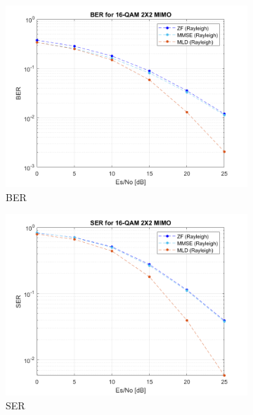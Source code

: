 \documentclass{article}
\begin{document}
\begin{figure}[H]
	\centering
	\begin{subfigure}{0.5\textwidth}
		\centerline{\includegraphics[width=1\textwidth]{b_Es_BER.png}}
		\caption{BER}
	\end{subfigure}%
	\begin{subfigure}{0.5\textwidth}
		\centerline{\includegraphics[width=1\textwidth]{b_Es_SER.png}}
		\caption{SER}
	\end{subfigure}\\%
	\begin{subfigure}{0.5\textwidth}

\end{subfigure}
\end{figure}
\end{document}

